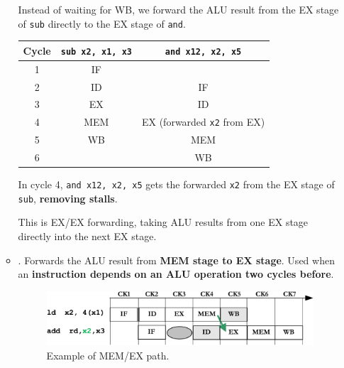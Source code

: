 \begin{enumerate}[label=\textcolor{Green3}{\faIcon{check}}]
\begin{itemize}
\begin{examplebox}[: EX/EX Forwarding]
         Instead of waiting for WB, we forward the ALU result from the EX stage of \texttt{sub} directly to the EX stage of \texttt{and}. 

         \begin{center}
            \begin{tabular}{@{} c | c | c @{}}
               \toprule
               \textbf{Cycle} & \texttt{sub x2, x1, x3} & \texttt{and x12, x2, x5} \\
               \midrule
               1 & IF  &                  \\ [.3em]
               2 & ID  & IF               \\ [.3em]
               3 & EX  & ID               \\ [.3em]
               4 & MEM & EX (forwarded \texttt{x2} from EX) \\ [.3em]
               5 & WB  & MEM              \\ [.3em]
               6 &     & WB               \\
               \bottomrule
            \end{tabular}
         \end{center}
         In cycle 4, \texttt{and x12, x2, x5} gets the forwarded \texttt{x2} from the EX stage of \texttt{sub}, \textbf{removing stalls}.

         This is EX/EX forwarding, taking ALU results from one EX stage directly into the next EX stage.
      \end{examplebox}

      \newpage
      
      \item {}. Forwards the ALU result from \textbf{MEM stage to EX stage}. Used when an \textbf{instruction depends on an ALU operation two cycles before}.
      \begin{figure}[!htp]
         \centering
         \includegraphics[width=\textwidth]{img/mem-ex-path-1.pdf}
         \caption{Example of MEM/EX path.}
      \end{figure}
      

\end{itemize}
\end{enumerate}
